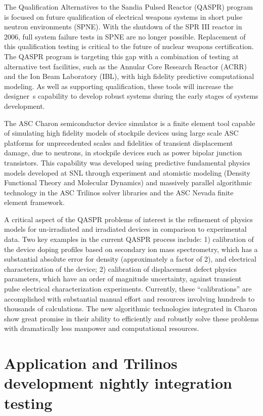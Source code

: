 \documentclass[pdf,ps2pdf,11pt]{SANDreport}
\begin{document}
The Qualification Alternatives to the Sandia Pulsed Reactor (QASPR) program is
focused on future qualification of electrical weapons systems in short pulse
neutron environments (SPNE).  With the shutdown of the SPR III reactor in
2006, full system failure tests in SPNE are no longer possible.  Replacement
of this qualification testing is critical to the future of nuclear weapons
certification.  The QASPR program is targeting this gap with a combination of
testing at alternative test facilities, such as the Annular Core Research
Reactor (ACRR) and the Ion Beam Laboratory (IBL), with high fidelity
predictive computational modeling.  As well as supporting qualification, these
tools will increase the designer~s capability to develop robust systems during
the early stages of systems development.

The ASC Charon semiconductor device simulator is a finite element tool capable
of simulating high fidelity models of stockpile devices using large scale ASC
platforms for unprecedented scales and fidelities of transient displacement
damage, due to neutrons, in stockpile devices such as power bipolar junction
transistors.  This capability was developed using predictive fundamental
physics models developed at SNL through experiment and atomistic modeling
(Density Functional Theory and Molecular Dynamics) and massively parallel
algorithmic technology in the ASC Trilinos solver libraries and the ASC Nevada
finite element framework.

A critical aspect of the QASPR problems of interest is the refinement of
physics models for un-irradiated and irradiated devices in comparison to
experimental data.  Two key examples in the current QASPR process include: 1)
calibration of the device doping profiles based on secondary ion mass
spectrometry, which has a substantial absolute error for density
(approximately a factor of 2), and electrical characterization of the device;
2) calibration of displacement defect physics parameters, which have an order
of magnitude uncertainty, against transient pulse electrical characterization
experiments.  Currently, these ``calibrations'' are accomplished with
substantial manual effort and resources involving hundreds to thousands of
calculations.  The new algorithmic technologies integrated in Charon show
great promise in their ability to efficiently and robustly solve these
problems with dramatically less manpower and computational resources.

%
\section{Application and Trilinos development nightly integration testing}
%
\end{document}

